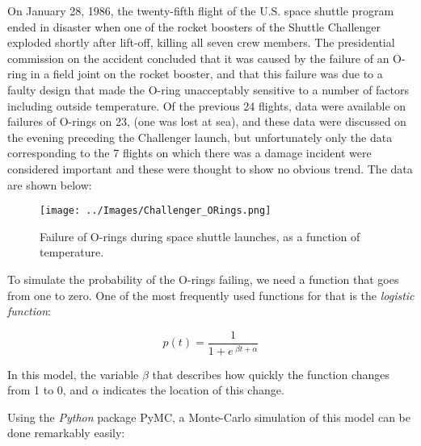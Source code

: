 On January 28, 1986, the twenty-fifth flight of the U.S. space shuttle program ended in disaster when one of the rocket boosters of the Shuttle Challenger exploded shortly after lift-off, killing all seven crew members. The presidential commission on the accident concluded that it was caused by the failure of an O-ring in a field joint on the rocket booster, and that this failure was due to a faulty design that made the O-ring unacceptably sensitive to a number of factors including outside temperature. Of the previous 24 flights, data were available on failures of O-rings on 23, (one was lost at sea), and these data were discussed on the evening preceding the Challenger launch, but unfortunately only the data corresponding to the 7 flights on which there was a damage incident were considered important and these were thought to show no obvious trend. The data are shown below:

\begin{figure}[H]
  \centering
  \texttt{[image: ../Images/Challenger\_ORings.png]}\\
  \caption{Failure of O-rings during space shuttle launches, as a function of temperature.}
\end{figure}

To simulate the probability of the O-rings failing, we need a function that goes from one to zero. One of the most frequently used functions for that is the \emph{logistic function}:

\begin{equation*}
  p(t) = \frac{1}{ 1 + e^{ \;\beta t + \alpha } }
\end{equation*}

In this model, the variable $\beta$ that describes how quickly the function changes from 1 to 0, and $\alpha$ indicates the location of this change.

Using the \emph{Python} package PyMC, a Monte-Carlo simulation of this model can be done remarkably easily:

